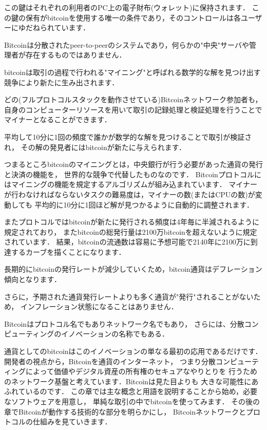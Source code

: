 \documentclass[a4paper,12pt]{jsarticle}
\begin{document}
この鍵はそれぞれの利用者のPC上の電子財布(ウォレット)に保持されます．
この鍵の保有がbitcoinを使用する唯一の条件であり，そのコントロールは各ユーザーにゆだねられています．

Bitcoinは分散されたpeer-to-peerのシステムであり，何らかの"中央"サーバや管理者が存在するものではありません．

bitcoinは取引の過程で行われる"マイニング"と呼ばれる数学的な解を見つけ出す競争により新たに生み出されます．

どの(フルプロトコルスタックを動作させている)Bitcoinネットワーク参加者も，
自身のコンピューターリソースを用いて取引の記録処理と検証処理を行うことでマイナーとなることができます．

平均して10分に1回の頻度で誰かが数学的な解を見つけることで取引が検証され，
その解の発見者にはbitcoinが新たに与えられます．

つまるところbitcoinのマイニングとは，中央銀行が行う必要があった通貨の発行と決済の機能を，
世界的な競争で代替したものなのです．
Bitcoinプロトコルにはマイニングの機能を規定するアルゴリズムが組み込まれています．
マイナーが行わなければならないタスクの難易度は，マイナーの数(またはCPUの数)が変動しても
平均的に10分に1回ほど解が見つかるように自動的に調整されます．

またプロトコルではbitcoinが新たに発行される頻度は4年毎に半減されるように規定されており，
またbitcoinの総発行量は2100万bitcoinを超えないように規定されています．
結果，bitcoinの流通数は容易に予想可能で2140年に2100万に到達するカーブを描くことになります．

長期的にbitcoinの発行レートが減少していくため，bitcoin通貨はデフレーション傾向となります．

さらに，予期された通貨発行レートよりも多く通貨が"発行"されることがないため，
インフレーション状態になることはありません．

Bitcoinはプロトコル名でもありネットワーク名でもあり，
さらには、分散コンピューティングのイノベーションの名称でもある．

通貨としてのbitcoinはこのイノベーションの単なる最初の応用であるだけです．
開発者の視点から，Bitcoinを通貨のインターネット，
つまり分散コンピューティングによって価値やデジタル資産の所有権のセキュアなやりとりを
行うためのネットワーク基盤と考えています．Bitcoinは見た目よりも
大きな可能性にあふれているのです．
この章では主な概念と用語を説明することから始め，必要なソフトウェアを用意し，
単純な取引の中でbitcoinを使ってみます．
その後の章でBitcoinが動作する技術的な部分を明らかにし，
Bitcoinネットワークとプロトコルの仕組みを見ていきます．
\end{document}
